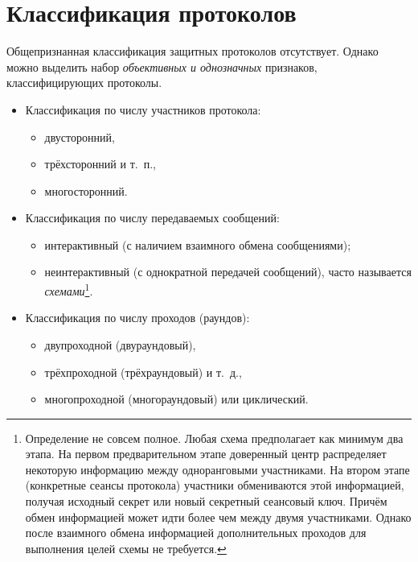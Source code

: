 \section{Классификация протоколов}\label{section-protocols-classification}

Общепризнанная классификация защитных протоколов отсутствует. Однако можно выделить набор \emph{объективных и однозначных} признаков, классифицирующих протоколы.

\begin{itemize}
    \item Классификация по числу участников протокола:
    \begin{itemize}
        \item двусторонний, 
        \item трёхсторонний и т.~п., 
        \item многосторонний.
    \end{itemize}
    \item Классификация по числу передаваемых сообщений:
    \begin{itemize}
        \item интерактивный (с наличием взаимного обмена сообщениями);
        \item неинтерактивный (с однократной передачей сообщений), часто называется \emph{схемами}\footnote{Определение не совсем полное. Любая схема предполагает как минимум два этапа. На первом предварительном этапе доверенный центр распределяет некоторую информацию между одноранговыми участниками. На втором этапе (конкретные сеансы протокола) участники обмениваются этой информацией, получая исходный секрет или новый секретный сеансовый ключ. Причём обмен информацией может идти более чем между двумя участниками. Однако после взаимного обмена информацией дополнительных проходов для выполнения целей схемы не требуется.}.
    \end{itemize}
    \item Классификация по числу проходов (раундов):
    \begin{itemize}
        \item двупроходной (двураундовый),
        \item трёхпроходной (трёхраундовый) и т.~д.,
        \item многопроходной (многораундовый) или циклический.
    \end{itemize}

\end{itemize}

